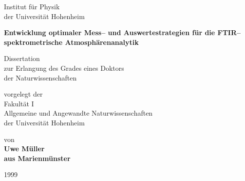 \thispagestyle{empty} \setlength{\topmargin}{-0.5cm}

\begin{center}
\vspace{-0.5cm} \large\sc Institut f\"{u}r Physik\\ der Universit\"{a}t
Hohenheim\\ \vspace{1.3cm}
\renewcommand{\baselinestretch}{1.2}

\LARGE \bf Entwicklung optimaler Mess-- und Auswertestrategien f\"{u}r
die FTIR--spektrometrische Atmosph\"{a}renanalytik \rm\\

\vspace{2.2cm}

\normalsize Dissertation\\ zur Erlangung des Grades eines
Doktors\\ der Naturwissenschaften


\vspace{1.7cm} vorgelegt der\\ \vspace{1.7cm} Fakult\"{a}t I\\
Allgemeine und Angewandte Naturwissenschaften\\ der Universit\"{a}t
Hohenheim

\vspace{1.7cm}

\large von\\


\large\bf Uwe M\"{u}ller\\ \normalsize\rm aus Marienm\"{u}nster

\vspace{0.9cm}

1999
\end{center}


\cleardoublepage
